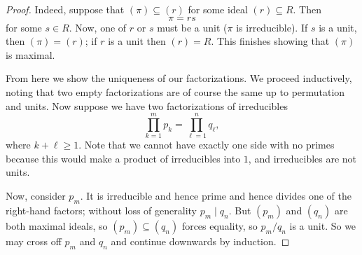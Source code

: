 \begin{proof}
	Indeed, suppose that $(\pi)\subseteq(r)$ for some ideal $(r)\subseteq R$. Then
	\[\pi=rs\]
	for some $s\in R$. Now, one of $r$ or $s$ must be a unit ($\pi$ is irreducible). If $s$ is a unit, then $(\pi)=(r)$; if $r$ is a unit then $(r)=R$. This finishes showing that $(\pi)$ is maximal.

	From here we show the uniqueness of our factorizations. We proceed inductively, noting that two empty factorizations are of course the same up to permutation and units. Now suppose we have two factorizations of irreducibles
	\[\prod_{k=1}^mp_k=\prod_{\ell=1}^nq_\ell,\]
	where $k+\ell\ge1$. Note that we cannot have exactly one side with no primes because this would make a product of irreducibles into $1$, and irreducibles are not units.

	Now, consider $p_m$. It is irreducible and hence prime and hence divides one of the right-hand factors; without loss of generality $p_m\mid q_n$. But $(p_m)$ and $(q_n)$ are both maximal ideals, so $(p_m)\subseteq(q_n)$ forces equality, so $p_m/q_n$ is a unit. So we may cross off $p_m$ and $q_n$ and continue downwards by induction.
\end{proof}

